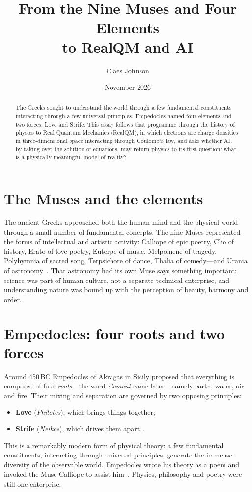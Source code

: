 \documentclass[11pt]{article}
\title{From the Nine Muses and Four Elements\\ to RealQM and AI}
\author{Claes Johnson}
\date{November 2026}
\begin{document}
\maketitle

\begin{abstract}
\noindent
The Greeks sought to understand the world through a few fundamental constituents interacting through
a few universal principles. Empedocles named four elements and two forces, Love and Strife. This essay
follows that programme through the history of physics to Real Quantum Mechanics (RealQM), in which
electrons are charge densities in three-dimensional space interacting through Coulomb's law, and asks
whether AI, by taking over the solution of equations, may return physics to its first question: what is
a physically meaningful model of reality?
\end{abstract}

\section{The Muses and the elements}

The ancient Greeks approached both the human mind and the physical world through a small number of
fundamental concepts. The nine Muses represented the forms of intellectual and artistic activity:
Calliope of epic poetry, Clio of history, Erato of love poetry, Euterpe of music, Melpomene of
tragedy, Polyhymnia of sacred song, Terpsichore of dance, Thalia of comedy---and Urania of astronomy~\cite{hesiod}.
That astronomy had its own Muse says something important: science was part of human culture, not a
separate technical enterprise, and understanding nature was bound up with the perception of beauty,
harmony and order.

\section{Empedocles: four roots and two forces}

Around 450\,BC Empedocles of Akragas in Sicily proposed that everything is composed of four
\emph{roots}---the word \emph{element} came later---namely earth, water, air and fire. Their mixing
and separation are governed by two opposing principles:
\begin{itemize}
\item \textbf{Love} (\emph{Philotes}), which brings things together;
\item \textbf{Strife} (\emph{Neikos}), which drives them apart~\cite{dk,krs,inwood}.
\end{itemize}
This is a remarkably modern form of physical theory: a few fundamental constituents, interacting through
universal principles, generate the immense diversity of the observable world. Empedocles wrote his theory
as a poem and invoked the Muse Calliope to assist him~\cite{dk}. Physics, philosophy and poetry were still one
enterprise.
\end{document}

